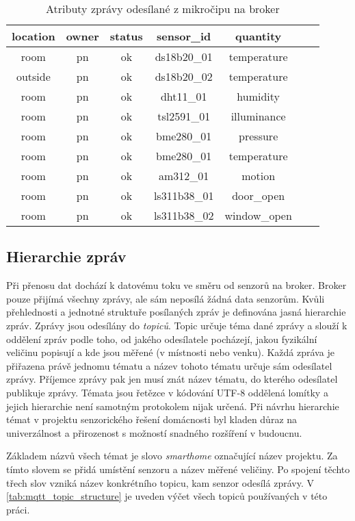 \begin{table}[h]
\centering
 \begin{tabular}{|c|c|c|c|c|c|c|} 
 \hline
  location & owner & status\footnotemark & sensor\_id & quantity  \\
 \hline\hline
 room & pn & ok & ds18b20\_01 & temperature \\ 
 outside & pn & ok & ds18b20\_02 & temperature \\
 room & pn & ok & dht11\_01 & humidity \\
 room & pn & ok & tsl2591\_01 & illuminance \\
 room & pn & ok & bme280\_01 & pressure \\
 room & pn & ok & bme280\_01 & temperature \\
 room & pn & ok & am312\_01 & motion \\
 room & pn & ok & ls311b38\_01 & door\_open \\
 room & pn & ok & ls311b38\_02 & window\_open \\
 \hline
 \end{tabular}
 \caption{Atributy zprávy odesílané z mikročipu na broker}
 \label{tab:mqtt_msg_structure}
\end{table}


\subsection{Hierarchie zpráv} \label{subsec:message_hierarchy}
Při přenosu dat dochází k datovému toku ve směru od senzorů na broker. Broker pouze přijímá všechny zprávy, ale sám neposílá žádná data senzorům. Kvůli přehlednosti a jednotné struktuře posílaných zpráv je definována jasná hierarchie zpráv. Zprávy jsou odesílány do \textit{topiců}. Topic určuje téma dané zprávy a slouží k oddělení zpráv podle toho, od jakého odesílatele pocházejí, jakou fyzikální veličinu popisují a kde jsou měřené (v místnosti nebo venku). Každá zpráva je přiřazena právě jednomu tématu a název tohoto tématu určuje sám odesílatel zprávy. Příjemce zprávy pak jen musí znát název tématu, do kterého odesílatel publikuje zprávy. Témata jsou řetězce v kódování UTF-8 oddělená lomítky a jejich hierarchie není samotným protokolem nijak určená. Při návrhu hierarchie témat v projektu senzorického řešení domácnosti byl kladen důraz na univerzálnost a přirozenost s možností snadného rozšíření v budoucnu. \par
Základem názvů všech témat je slovo \textit{smarthome} označující název projektu. Za tímto slovem se přidá umístění senzoru a název měřené veličiny. Po spojení těchto třech slov vzniká název konkrétního topicu, kam senzor odesílá zprávy. V \cref{tab:mqtt_topic_structure} je uveden výčet všech topiců používaných v této práci.

